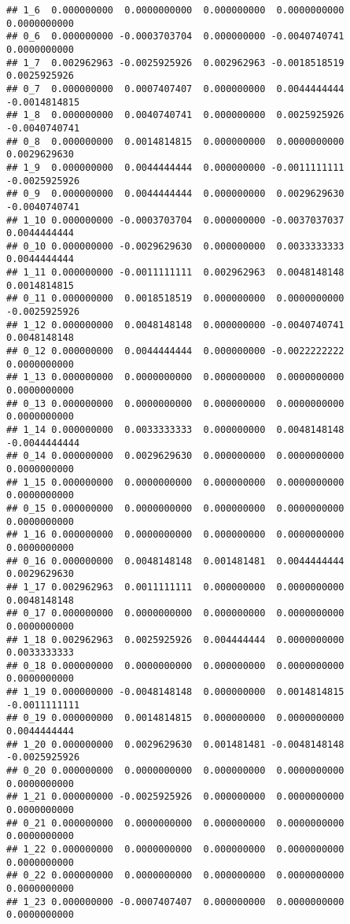 \documentclass[]{article}
\begin{document}
\begin{verbatim}
## 1_6  0.000000000  0.0000000000  0.000000000  0.0000000000  0.0000000000
## 0_6  0.000000000 -0.0003703704  0.000000000 -0.0040740741  0.0000000000
## 1_7  0.002962963 -0.0025925926  0.002962963 -0.0018518519  0.0025925926
## 0_7  0.000000000  0.0007407407  0.000000000  0.0044444444 -0.0014814815
## 1_8  0.000000000  0.0040740741  0.000000000  0.0025925926 -0.0040740741
## 0_8  0.000000000  0.0014814815  0.000000000  0.0000000000  0.0029629630
## 1_9  0.000000000  0.0044444444  0.000000000 -0.0011111111 -0.0025925926
## 0_9  0.000000000  0.0044444444  0.000000000  0.0029629630 -0.0040740741
## 1_10 0.000000000 -0.0003703704  0.000000000 -0.0037037037  0.0044444444
## 0_10 0.000000000 -0.0029629630  0.000000000  0.0033333333  0.0044444444
## 1_11 0.000000000 -0.0011111111  0.002962963  0.0048148148  0.0014814815
## 0_11 0.000000000  0.0018518519  0.000000000  0.0000000000 -0.0025925926
## 1_12 0.000000000  0.0048148148  0.000000000 -0.0040740741  0.0048148148
## 0_12 0.000000000  0.0044444444  0.000000000 -0.0022222222  0.0000000000
## 1_13 0.000000000  0.0000000000  0.000000000  0.0000000000  0.0000000000
## 0_13 0.000000000  0.0000000000  0.000000000  0.0000000000  0.0000000000
## 1_14 0.000000000  0.0033333333  0.000000000  0.0048148148 -0.0044444444
## 0_14 0.000000000  0.0029629630  0.000000000  0.0000000000  0.0000000000
## 1_15 0.000000000  0.0000000000  0.000000000  0.0000000000  0.0000000000
## 0_15 0.000000000  0.0000000000  0.000000000  0.0000000000  0.0000000000
## 1_16 0.000000000  0.0000000000  0.000000000  0.0000000000  0.0000000000
## 0_16 0.000000000  0.0048148148  0.001481481  0.0044444444  0.0029629630
## 1_17 0.002962963  0.0011111111  0.000000000  0.0000000000  0.0048148148
## 0_17 0.000000000  0.0000000000  0.000000000  0.0000000000  0.0000000000
## 1_18 0.002962963  0.0025925926  0.004444444  0.0000000000  0.0033333333
## 0_18 0.000000000  0.0000000000  0.000000000  0.0000000000  0.0000000000
## 1_19 0.000000000 -0.0048148148  0.000000000  0.0014814815 -0.0011111111
## 0_19 0.000000000  0.0014814815  0.000000000  0.0000000000  0.0044444444
## 1_20 0.000000000  0.0029629630  0.001481481 -0.0048148148 -0.0025925926
## 0_20 0.000000000  0.0000000000  0.000000000  0.0000000000  0.0000000000
## 1_21 0.000000000 -0.0025925926  0.000000000  0.0000000000  0.0000000000
## 0_21 0.000000000  0.0000000000  0.000000000  0.0000000000  0.0000000000
## 1_22 0.000000000  0.0000000000  0.000000000  0.0000000000  0.0000000000
## 0_22 0.000000000  0.0000000000  0.000000000  0.0000000000  0.0000000000
## 1_23 0.000000000 -0.0007407407  0.000000000  0.0000000000  0.0000000000

\end{verbatim}
\end{document}
